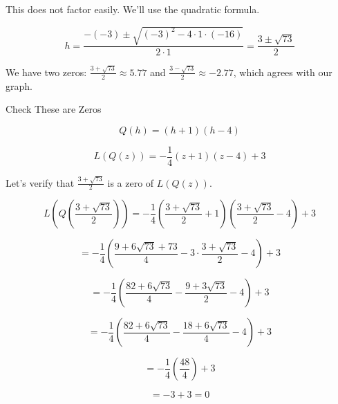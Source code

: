 \documentclass{ximera}
\begin{document}
This does not factor easily.  We'll use the quadratic formula.


\[  h = \frac{-(-3) \pm \sqrt{(-3)^2 - 4 \cdot 1 \cdot (-16)}}{2 \cdot 1}  = \frac{3 \pm \sqrt{73}}{2}     \]


We have two zeros: $\frac{3 + \sqrt{73}}{2}  \approx 5.77$ and $\frac{3 - \sqrt{73}}{2} \approx -2.77$, which agrees with our graph.



\begin{claim} Check These are Zeros


\[   Q(h) = (h+1)(h-4)   \]


\[   L(Q(z)) = -\frac{1}{4} (z+1)(z-4) + 3   \]


Let's verify that $\frac{3 + \sqrt{73}}{2}$ is a zero of $L(Q(z))$.



\[   L \left( Q \left( \frac{3 + \sqrt{73}}{2} \right) \right) = -\frac{1}{4} \left( \frac{3 + \sqrt{73}}{2}+1 \right) \left( \frac{3 + \sqrt{73}}{2}-4 \right) + 3    \]



\[  = -\frac{1}{4} \left( \frac{9 + 6 \sqrt{73} + 73}{4} - 3 \cdot \frac{3 + \sqrt{73}}{2} - 4 \right) + 3    \]


\[  = -\frac{1}{4} \left( \frac{82 + 6 \sqrt{73}}{4} - \frac{9 + 3 \sqrt{73}}{2} - 4 \right) + 3    \]


\[  = -\frac{1}{4} \left( \frac{82 + 6 \sqrt{73}}{4} - \frac{18 + 6 \sqrt{73}}{4} - 4 \right) + 3    \]


\[  = -\frac{1}{4} \left( \frac{48}{4} \right) + 3    \]


\[  = -3 + 3   = 0 \]


\end{claim}
\end{document}

